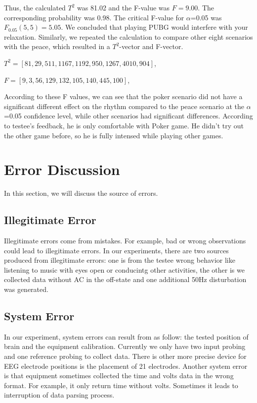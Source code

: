 \documentclass[letterpaper,twocolumn,10pt]{article}
\begin{document}
Thus, the calculated $T^2$ was 81.02 and the F-value was $F=9.00$. The corresponding probability was 0.98. The critical F-value for $\alpha$=0.05 was $F_{0.05}(5,5)= 5.05$. We concluded that playing PUBG would interfere with your relaxation. Similarly, we repeated the calculation to compare other eight scenarios with the peace, which resulted in a $T^2$-vector and F-vector.

$T^2=[81, 29, 511, 1167, 1192, 950, 1267, 4010, 904]$,

$F = [9, 3, 56, 129, 132, 105, 140, 445, 100]$,

According to these F values, we can see that the poker scenario did not have a significant different effect on the rhythm compared to the peace scenario at the $\alpha$=0.05 confidence level, while other scenarios had significant differences. According to testee's feedback, he is only comfortable with Poker game. He didn't try out the other game before, so he is fully intensed while playing other games.

\section{Error Discussion}
In this section, we will discuss the source of errors.

\subsection{Illegitimate Error}

Illegitimate errors come from mistakes. For example, bad or wrong observations could lead to illegitimate errors. In our experiments, there are two sources produced from illegitimate errors: one is from the testee wrong behavior like listening to music with eyes open or conducintg other activities, the other is we collected data without AC in the off-state and one additional 50Hz disturbation was generated.

\subsection{System Error}

In our experiment, system errors can result from as follow: the tested position of brain and the equipment calibration. Currently we only have two input probing and one reference probing to collect data. There is other more precise device for EEG electrode positions is the placement of 21 electrodes. Another system error is that equipment sometimes collected the time and volts data in the wrong format. For example, it only return time without volts. Sometimes it leads to interruption of data parsing process.
\end{document}
